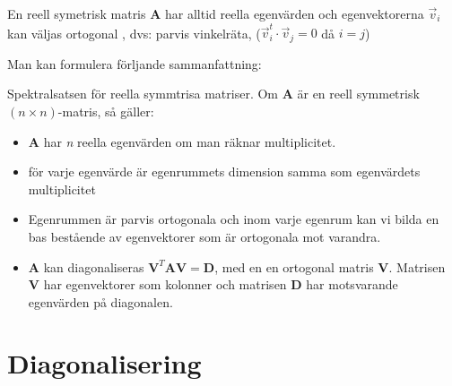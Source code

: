 \begin{sats}
	En reell symetrisk matris \textbf{A} har alltid reella egenvärden och egenvektorerna $\vec{v}_i$ kan väljas ortogonal , dvs: parvis vinkelräta, ($\vec{v}_i^t \cdot \vec{v}_j = 0$ då $i = j$)
\end{sats}
Man kan formulera förljande sammanfattning:
\begin{sats}
	Spektralsatsen för reella symmtrisa matriser. Om \textbf{A} är en reell symmetrisk $(n \times n)$-matris, så gäller:
	\begin{itemize}
		\item \textbf{A} har \textit{n} reella egenvärden om man räknar multiplicitet.
		\item för varje egenvärde är egenrummets dimension samma som egenvärdets multiplicitet
		\item Egenrummen är parvis ortogonala och inom varje egenrum kan vi bilda en bas bestående av egenvektorer som är ortogonala mot varandra.
		\item \textbf{A} kan diagonaliseras $\mathbf{V}^T \mathbf{A} \mathbf{V} = \mathbf{D}$, med en en ortogonal matris \textbf{V}. Matrisen \textbf{V} har egenvektorer som kolonner och matrisen \textbf{D} har motsvarande egenvärden på diagonalen. 
	\end{itemize}
\end{sats}

\section{Diagonalisering} %
\label{sec:diagonalisering}

